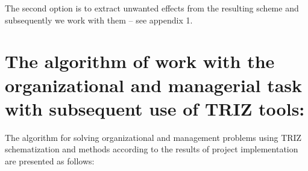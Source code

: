The second option is to extract unwanted effects from the resulting scheme and
subsequently we work with them -- see appendix 1.

\section{The algorithm of work with the organizational and managerial task with
subsequent use of TRIZ tools:}

The algorithm for solving organizational and management problems using TRIZ
schematization and methods according to the results of project implementation
are presented as follows:


